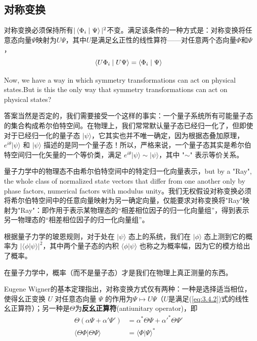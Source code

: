 \subsection{对称变换}
对称变换必须保持所有$|\left\langle {{{\Phi _i}}}
\mathrel{\left | {\vphantom {{{\Phi _i}} \Psi }}
	\right. \kern-\nulldelimiterspace}
{\Psi } \right\rangle {|^2}$不变。满足该条件的一种方式是：对称变换将任意态向量$\Psi$映射为$U\Psi$，其中$U$是满足幺正性的线性算符——对任意两个态向量$\Phi$和$\Psi$，
\begin{equation}
	\left\langle {{U{\Phi _i}}}
	\mathrel{\left | {\vphantom {{U{\Phi _i}} {U\Psi }}}
		\right. \kern-\nulldelimiterspace}
	{{U\Psi }} \right\rangle  = \left\langle {{{\Phi _i}}}
	\mathrel{\left | {\vphantom {{{\Phi _i}} \Psi }}
		\right. \kern-\nulldelimiterspace}
	{\Psi } \right\rangle \label{eq:3.4.2}
\end{equation}
\par
Now, we have a way in which symmetry transformations can act on physical states.But is this the only way that symmetry transformations can act on physical states?
\par
答案当然是否定的，我们需要接受一个这样的事实：一个量子系统所有可能量子态的集合构成希尔伯特空间。在物理上，我们常常默认量子态已经归一化了，但即使对于已经归一化的量子态 $|\psi\rangle$，它其实也并不唯一确定，因为根据态叠加原理，$e^{i\theta}|\psi\rangle$ 和 $|\psi\rangle$ 描述的是同一个量子态！所以，严格来说，一个量子态其实是希尔伯特空间归一化矢量的一个等价类，满足 $e^{i\theta}|\psi\rangle \sim |\psi\rangle$，其中 "$\sim$" 表示等价关系。\par
量子力学中的物理态不由希尔伯特空间中的特定归一化向量表示，but by a "Ray", the whole class of normalized state vectors that differ from one another only by phase factors, numerical factors with modulus unity。我们无权假设对称变换必须将希尔伯特空间中的任意向量映射为另一确定向量，仅能要求对称变换将"Ray"映射为"Ray"：即作用于表示某物理态的“相差相位因子的归一化向量组”，得到表示另一物理态的“相差相位因子的归一化向量组”。\par
根据量子力学的玻恩规则，对于处在 $|\psi\rangle$ 态上的系统，我们在 $|\phi\rangle$ 态上测到它的概率为 $|\langle\phi|\psi\rangle|^{2}$，其中两个量子态的内积 $\langle\phi|\psi\rangle$ 也称之为概率幅，因为它的模方给出了概率。

在量子力学中，概率（而不是量子态）才是我们在物理上真正测量的东西。

Eugene Wigner的基本定理指出，对称变换方式仅有两种：一种是选择适当相位，使得幺正变换 $U$ 对任意态向量 $\Psi$ 的作用为$\Psi\mapsto U\Psi$（$U$是满足(\ref{eq:3.4.2})式的线性幺正算符）；另一种是$\Theta$为\textbf{反幺正算符}(antiunitary operator)，即
\begin{align}
	\Theta(\alpha\Psi + \alpha'\Psi') &= \alpha^* \Theta\Psi + \alpha'^* \Theta\Psi' \\
	\langle \Theta\Phi | \Theta\Psi \rangle &= \langle \Phi | \Psi \rangle^*\label{eq:3.4.10}
\end{align}

